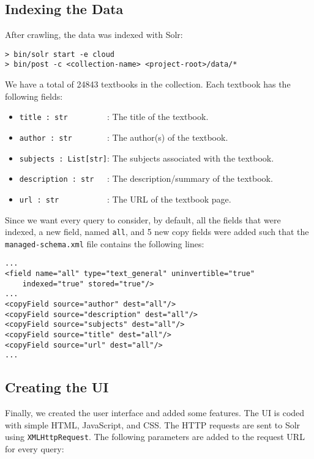 \documentclass[a4paper,10pt]{report}
\begin{document}
\subsection*{Indexing the Data}

After crawling, the data was indexed with Solr:

\begin{verbatim}
> bin/solr start -e cloud
> bin/post -c <collection-name> <project-root>/data/*
\end{verbatim}

We have a total of 24843 textbooks in the collection. Each textbook has the following fields:

\begin{itemize}
\item \verb|title : str         |: The title of the textbook.
\item \verb|author : str        |: The author(s) of the textbook.
\item \verb|subjects : List[str]|: The subjects associated with the textbook.
\item \verb|description : str   |: The description/summary of the textbook.
\item \verb|url : str           |: The URL of the textbook page.
\end{itemize}

Since we want every query to consider, by default, all the fields that were indexed, a new field, named \verb|all|, and 5 new copy fields were added such that the \verb|managed-schema.xml| file contains the following lines:

\begin{verbatim}
...
<field name="all" type="text_general" uninvertible="true"
    indexed="true" stored="true"/>
...
<copyField source="author" dest="all"/>
<copyField source="description" dest="all"/>
<copyField source="subjects" dest="all"/>
<copyField source="title" dest="all"/>
<copyField source="url" dest="all"/>
...
\end{verbatim}

\subsection*{Creating the UI}

Finally, we created the user interface and added some features. The UI is coded with simple HTML, JavaScript, and CSS. The HTTP requests are sent to Solr using \verb|XMLHttpRequest|. The following parameters are added to the request URL for every query:
\end{document}

